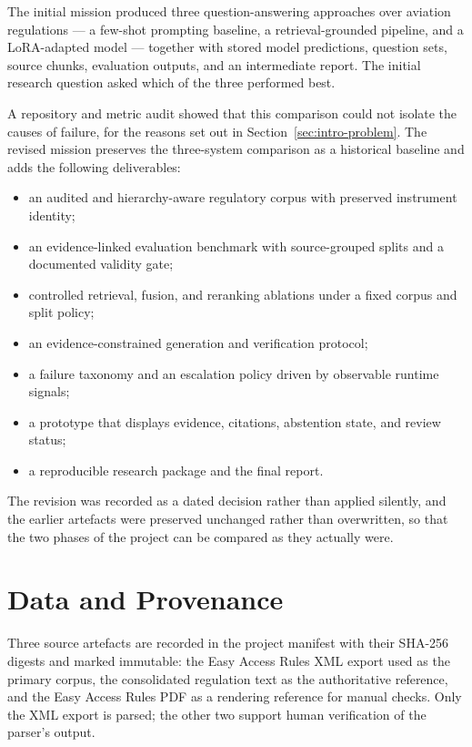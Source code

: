 The initial mission produced three question-answering approaches over aviation regulations --- a few-shot prompting baseline, a retrieval-grounded pipeline, and a \ac{LoRA}-adapted model --- together with stored model predictions, question sets, source chunks, evaluation outputs, and an intermediate report. The initial research question asked which of the three performed best.

A repository and metric audit showed that this comparison could not isolate the causes of failure, for the reasons set out in Section~\ref{sec:intro-problem}. The revised mission preserves the three-system comparison as a historical baseline and adds the following deliverables:

\begin{itemize}
  \item an audited and hierarchy-aware regulatory corpus with preserved instrument identity;
  \item an evidence-linked evaluation benchmark with source-grouped splits and a documented validity gate;
  \item controlled retrieval, fusion, and reranking ablations under a fixed corpus and split policy;
  \item an evidence-constrained generation and verification protocol;
  \item a failure taxonomy and an escalation policy driven by observable runtime signals;
  \item a prototype that displays evidence, citations, abstention state, and review status;
  \item a reproducible research package and the final report.
\end{itemize}

The revision was recorded as a dated decision rather than applied silently, and the earlier artefacts were preserved unchanged rather than overwritten, so that the two phases of the project can be compared as they actually were.

\section{Data and Provenance}
\label{sec:context-data}

Three source artefacts are recorded in the project manifest with their SHA-256 digests and marked immutable: the Easy Access Rules XML export used as the primary corpus, the consolidated regulation text as the authoritative reference, and the Easy Access Rules PDF as a rendering reference for manual checks. Only the XML export is parsed; the other two support human verification of the parser's output.


